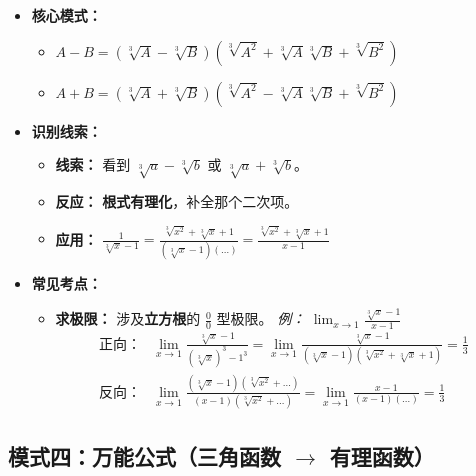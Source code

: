 \documentclass[lang=cn,math=mtpro2,11pt,scheme=chinese]{elegantbook}
\begin{document}
\begin{itemize}
    \item \textbf{核心模式：}
    \begin{itemize}
        \item $A - B = (\sqrt[3]{A} - \sqrt[3]{B})(\sqrt[3]{A^2} + \sqrt[3]{A}\sqrt[3]{B} + \sqrt[3]{B^2})$
        \item $A + B = (\sqrt[3]{A} + \sqrt[3]{B})(\sqrt[3]{A^2} - \sqrt[3]{A}\sqrt[3]{B} + \sqrt[3]{B^2})$
    \end{itemize}

    \item \textbf{识别线索：}
    \begin{itemize}
        \item \textbf{线索：} 看到 $\sqrt[3]{a} - \sqrt[3]{b}$ 或 $\sqrt[3]{a} + \sqrt[3]{b}$。
        \item \textbf{反应：} \textbf{根式有理化}，补全那个二次项。
        \item \textbf{应用：} $\frac{1}{\sqrt[3]{x} - 1} = \frac{\sqrt[3]{x^2} + \sqrt[3]{x} + 1}{(\sqrt[3]{x} - 1)(\dots)} = \frac{\sqrt[3]{x^2} + \sqrt[3]{x} + 1}{x - 1}$
    \end{itemize}
    
    \item \textbf{常见考点：}
    \begin{itemize}
        \item \textbf{求极限：} 涉及\textbf{立方根}的 $\frac{0}{0}$ 型极限。
        \textit{例：} $\lim_{x \to 1} \frac{\sqrt[3]{x} - 1}{x - 1}$
        \begin{align*}
            \text{正向：} & \lim_{x \to 1} \frac{\sqrt[3]{x} - 1}{(\sqrt[3]{x})^3 - 1^3} = \lim_{x \to 1} \frac{\sqrt[3]{x} - 1}{(\sqrt[3]{x} - 1)(\sqrt[3]{x^2} + \sqrt[3]{x} + 1)} = \frac{1}{3} \\
            \text{反向：} & \lim_{x \to 1} \frac{(\sqrt[3]{x} - 1)(\sqrt[3]{x^2} + \dots)}{(x - 1)(\sqrt[3]{x^2} + \dots)} = \lim_{x \to 1} \frac{x - 1}{(x - 1)(\dots)} = \frac{1}{3}
        \end{align*}
    \end{itemize}
\end{itemize}

\subsection{模式四：万能公式（三角函数 $\to$ 有理函数）}
\end{document}
